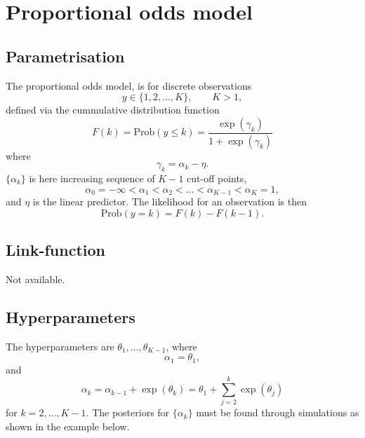 \documentclass[a4paper,11pt]{article}
\begin{document}
\section*{Proportional odds model}

\subsection*{Parametrisation}

The proportional odds model, is for discrete observations
\begin{displaymath}
    y \in \{ 1, 2, \ldots, K\}, \qquad K>1,
\end{displaymath}
defined via the cummulative distribution function
\begin{displaymath}
    F(k) = \text{Prob}(y \le k)  = \frac{\exp(\gamma_k)}{1 + \exp(\gamma_k)}
\end{displaymath}
where
\begin{displaymath}
    \gamma_k = \alpha_k - \eta.
\end{displaymath}
$\{\alpha_k\}$ is here increasing sequence of $K-1$ cut-off points, 
\begin{displaymath}
    \alpha_{0} = -\infty < \alpha_1 < \alpha_2 < \ldots < \alpha_{K-1}
    < \alpha_K=1,
\end{displaymath}
and $\eta$ is the linear predictor. The likelihood for an observation
is then
\begin{displaymath}
    \text{Prob}(y = k) = F(k) - F(k-1).
\end{displaymath}

\subsection*{Link-function}

Not available.

\subsection*{Hyperparameters}

The hyperparameters are $\theta_1, \ldots, \theta_{K-1}$, where
\begin{displaymath}
    \alpha_1 = \theta_1,
\end{displaymath}
and 
\begin{displaymath}
    \alpha_{k} = \alpha_{k-1} + \exp(\theta_{k}) = \theta_1 +
    \sum_{j=2}^{k} \exp(\theta_j)
\end{displaymath}
for $k=2, \ldots, K-1$. The posteriors for $\{\alpha_k\}$ must be
found through simulations as shown in the example below.
\end{document}
